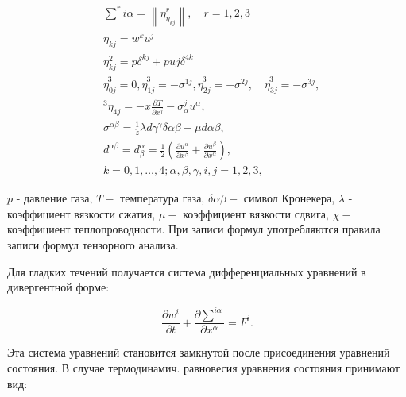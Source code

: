 \documentclass[10pt]{article}
\begin{document}
\[

\begin{aligned}

& \sum^{r} i \alpha=\left\|\eta_{\eta_{k j}}^{r}\right\|, \quad r=1,2,3 \\

& \eta_{k j}=w^{k} u^{j} \\

& \eta_{k j}^{2}=p \delta^{k j}+p u j \delta^{4 k} \\

& \stackrel{3}{\eta_{0 j}}=0, \stackrel{3}{\eta_{1 j}}=-\sigma^{1 j}, \stackrel{3}{\eta_{2 j}}=-\sigma^{2 j}, \quad \stackrel{3}{\eta_{3 j}}=-\sigma^{3 j}, \\

& { }^{3} \eta_{4 j}=-x \frac{\partial T}{\partial x^{j}}-\sigma_{\alpha}^{j} u^{\alpha}, \\

& \sigma^{\alpha \beta}=\frac{1}{\ddot{z}} \lambda d \mathcal{\gamma}^{\gamma} \delta \alpha \beta+\mu d \alpha \beta, \\

& d^{\alpha \beta}=d_{\beta}^{\alpha}=\frac{1}{2}\left(\frac{\partial u^{\alpha}}{\partial x^{\beta}}+\frac{\partial u^{\beta}}{\partial x^{\alpha}}\right), \\

& k=0,1, \ldots, 4 ; \alpha, \beta, \gamma, i, j=1,2,3 \text {, }

\end{aligned}

\]



$p$ - давление газа, $T-$ температура газа, $\delta \alpha \beta-$ символ Кронекера, $\lambda$ - коэффициент вязкости сжатия, $\mu-$ коэффициент вязкости сдвига, $\chi-$ коэффициент теплопроводности. При записи формул употребляются правила записи формул тензорного анализа.



Для гладких течений получается система дифференциальных уравнений в дивергентной форме:



\[

\frac{\partial w^{i}}{\partial t}+\frac{\partial \sum^{i \alpha}}{\partial x^{\alpha}}=F^{i} .

\]



Эта система уравнений становится замкнутой после присоединения уравнений состояния. В случае термодинамич. равновесия уравнения состояния принимают вид:
\end{document}
